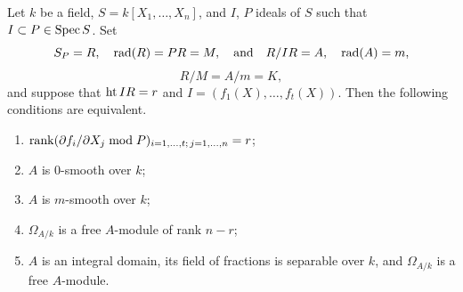 \begin{theorem}\label{thm:30.3}
Let $k$ be a field, $S = k[X_1, \ldots, X_n]$, and $I$, $P$ ideals of $S$ such that
$I \subset P \in \operatorname{Spec} S$. Set
\[
  S_P = R, \quad \operatorname{rad}(R) = PR = M, \quad \text{and} \quad R/IR = A, \quad \operatorname{rad}(A) = m,
\]
\[
  R/M = A/m = K,
\]
and suppose that $\operatorname{ht} IR = r$ and $I = (f_1(X), \ldots, f_t(X))$. Then the following
conditions are equivalent.
\begin{enumerate}[(1)]
  \item $\operatorname{rank}(\partial f_i/\partial X_j \bmod P)_{i=1, \ldots, t;\, j=1, \ldots, n} = r$;
  \item $A$ is 0-smooth over $k$;
  \item $A$ is $m$-smooth over $k$;
  \item $\Omega_{A/k}$ is a free $A$-module of rank $n - r$;
  \item $A$ is an integral domain, its field of fractions is separable over $k$, and
        $\Omega_{A/k}$ is a free $A$-module.
\end{enumerate}
\end{theorem}

